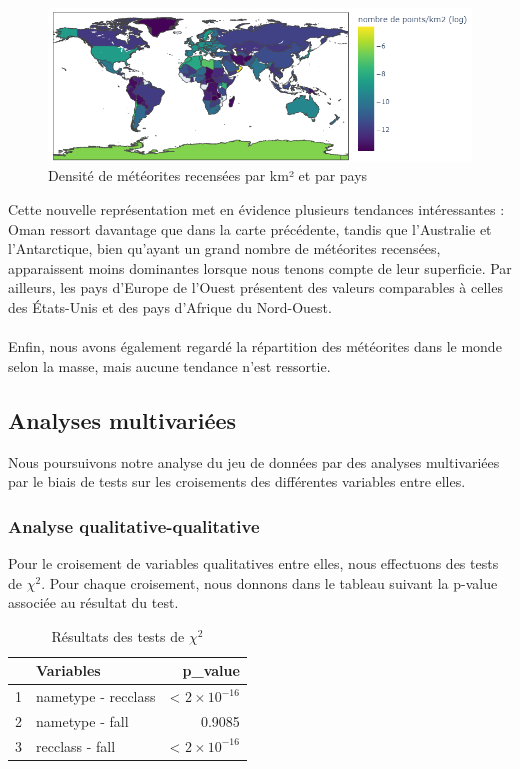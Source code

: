 \documentclass[12pt]{article}
\begin{document}
\begin{figure}[H] 
\centering
 \includegraphics[width=17cm]{Images/exploration/map_points_km2_avec_echelle.png}
 \caption{Densité de météorites recensées par km² et par pays}
 \end{figure}
Cette nouvelle représentation met en évidence plusieurs tendances intéressantes : Oman ressort davantage que dans la carte précédente, tandis que l’Australie et l’Antarctique, bien qu’ayant un grand nombre de météorites recensées, apparaissent moins dominantes lorsque nous tenons compte de leur superficie. Par ailleurs, les pays d’Europe de l’Ouest présentent des valeurs comparables à celles des États-Unis et des pays d’Afrique du Nord-Ouest.\\
\\
Enfin, nous avons également regardé la répartition des météorites dans le monde selon la masse, mais aucune tendance n'est ressortie.

\subsection{Analyses multivariées}
Nous poursuivons notre analyse du jeu de données par des analyses multivariées par le biais de tests sur les croisements des différentes variables entre elles.
\subsubsection*{Analyse qualitative-qualitative}

Pour le croisement de variables qualitatives entre elles, nous effectuons des tests de $\chi^2$. Pour chaque croisement, nous donnons dans le tableau suivant la p-value associée au résultat du test.
\begin{table}[H]
\centering
\begin{tabular}{rlr}
  \hline
 & Variables & p\_value \\ 
  \hline
1 & nametype - recclass & < $2\times 10^{-16}$  \\ 
  2 & nametype - fall & 0.9085 \\ 
  3 & recclass - fall & < $2\times 10^{-16}$  \\ 
   \hline
\end{tabular}
\caption{Résultats des tests de $\chi^2$}
\end{table}
\end{document}
